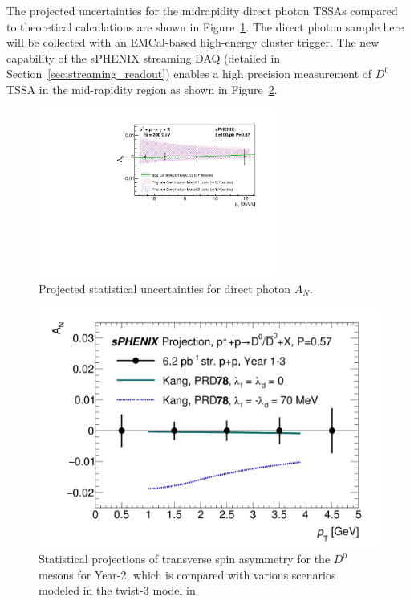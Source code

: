 The projected uncertainties for the midrapidity direct photon TSSAs compared to theoretical calculations are shown in Figure~\ref{fig:AN_dp}. The direct photon sample here will be collected with an EMCal-based high-energy cluster trigger. 
The new capability of the sPHENIX streaming DAQ (detailed in
Section~\ref{sec:streaming_readout}) enables a high precision
measurement of $D^0$ TSSA in the mid-rapidity region as shown in
Figure~\ref{fig:AN-D0year20232025}. 

\begin{figure}[htbp]
\centering
\includegraphics[width=0.70\textwidth]{figs/AN_dp_sphenix.pdf}
\caption{Projected statistical uncertainties for direct photon $A_N$.}
\label{fig:AN_dp}
\end{figure}

\begin{figure}[htbp]
\begin{center}
\includegraphics[width=.6\linewidth]{figs/D0_BUP2020_AN_3yr.pdf}
\caption{Statistical projections of
  transverse spin asymmetry for the $D^0$ mesons for Year-2, which is compared with various scenarios modeled in the twist-3 model in~\cite{Kang:2008ih}} 
\label{fig:AN-D0year20232025}
\end{center}
\end{figure}

